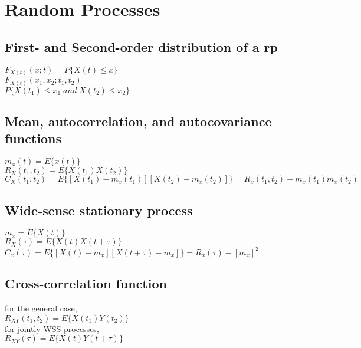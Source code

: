 \section*{Random Processes}

\subsection*{First- and Second-order distribution of a rp} 
$F_{X(t)}(x;t)=P\{X(t) \leq x\}$ \\
$F_{X(t)}(x_1,x_2;t_1,t_2)=$ \\ $P\{X(t_1)\leq x_1 \; and \; X(t_2) \leq x_2\}$

\subsection*{Mean, autocorrelation, and autocovariance functions}
$m_x(t)=E\{x(t)\}$ \\
$R_X(t_1,t_2)=E\{X(t_1)X(t_2)\}$ \\
$C_X(t_1,t_2)=E\{[X(t_1)-m_x(t_1)][X(t_2)-m_x(t_2)]\}=R_x(t_1,t_2)-m_x(t_1)m_x(t_2)$

\subsection*{Wide-sense stationary process}
$m_x=E\{X(t)\} $\\
$R_X(\tau)=E\{X(t)X(t+\tau)\}$ \\
$C_x(\tau)=E\{[X(t)-m_x][X(t+\tau)-m_x]\}=R_x(\tau)-[m_x]^2$ 

\subsection*{Cross-correlation function}
for the general case, \\
$R_{XY}(t_1,t_2)=E\{X(t_1)Y(t_2)\}$ \\
for jointly WSS processes, \\
$R_{XY}(\tau)=E\{X(t)Y(t+\tau)\}$
